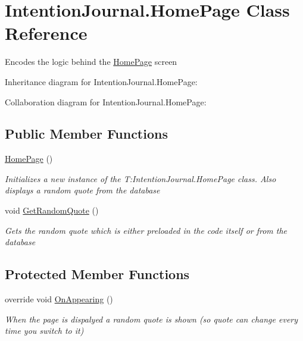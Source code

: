 \hypertarget{class_intention_journal_1_1_home_page}{}\section{Intention\+Journal.\+Home\+Page Class Reference}
\label{class_intention_journal_1_1_home_page}


Encodes the logic behind the \hyperlink{class_intention_journal_1_1_home_page}{Home\+Page} screen  




Inheritance diagram for Intention\+Journal.\+Home\+Page\+:


Collaboration diagram for Intention\+Journal.\+Home\+Page\+:
\subsection*{Public Member Functions}
\begin{DoxyCompactItemize}
\item 
\hyperlink{class_intention_journal_1_1_home_page_a69f39a8c0264f0a8fc82a2775a3a737a}{Home\+Page} ()
\begin{DoxyCompactList}\small\item\em Initializes a new instance of the T\+:\+Intention\+Journal.\+Home\+Page class. Also displays a random quote from the database \end{DoxyCompactList}\item 
void \hyperlink{class_intention_journal_1_1_home_page_a915b597ebcc642821b55a56090239816}{Get\+Random\+Quote} ()
\begin{DoxyCompactList}\small\item\em Gets the random quote which is either preloaded in the code itself or from the database \end{DoxyCompactList}\end{DoxyCompactItemize}
\subsection*{Protected Member Functions}
\begin{DoxyCompactItemize}
\item 
override void \hyperlink{class_intention_journal_1_1_home_page_a204c50a6ce564041bf17f06ec3686e9f}{On\+Appearing} ()
\begin{DoxyCompactList}\small\item\em When the page is dispalyed a random quote is shown (so quote can change every time you switch to it) \end{DoxyCompactList}\end{DoxyCompactItemize}


